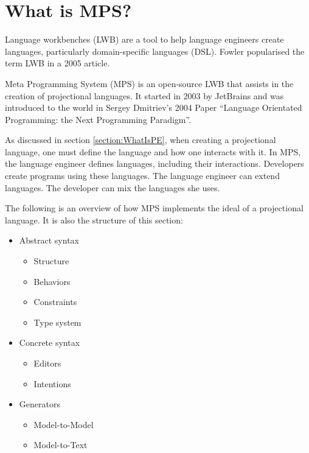 \section{What is MPS?}
\label{section:MPS}

Language workbenches (LWB) are a tool to help language engineers create languages, particularly domain-specific languages (DSL).
Fowler\cite{Fowler_lwb} popularised the term LWB in a 2005 article.

Meta Programming System (MPS) is an open-source LWB that assists in the creation of projectional languages.
It started in 2003 by JetBrains and was introduced to the world in Sergey Dmitriev's 2004 Paper ``Language Orientated Programming: the Next Programming Paradigm''\cite{dmitriev2004language}.

As discussed in section \ref{section:WhatIsPE}, when creating a projectional language, one must define the language and how one interacts with it.
In MPS, the language engineer defines languages, including their interactions.
Developers create programs using these languages.
The language engineer can extend languages.
The developer can mix the languages she uses.

The following is an overview of how MPS implements the ideal of a projectional language.
It is also the structure of this section: 

\begin{itemize}
    \setlength\itemsep{0em}
    \item Abstract syntax
    \begin{itemize}
        \setlength\itemsep{0em}
        \item Structure
        \item Behaviors
        \item Constraints
        \item Type system
    \end{itemize}
    \item Concrete syntax
    \begin{itemize}
        \setlength\itemsep{0em}
        \item Editors
        \item Intentions
    \end{itemize}
    \item Generators
    \begin{itemize}
        \setlength\itemsep{0em}
        \item Model-to-Model
        \item Model-to-Text
    \end{itemize}
\end{itemize}

